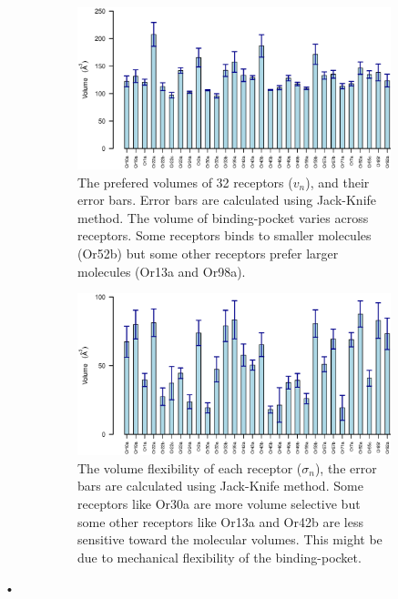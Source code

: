 \documentclass[11pt]{paper} %
\newcommand{\numberofreceptors}{32 }
\begin{document}
\begin{figure}
	\begin{subfigure}[b]{\textwidth}
		\includegraphics[width=\textwidth]{fig/mean-vol}
		\caption{The prefered volumes of \numberofreceptors receptors ($v_n$), and their error bars. Error bars are calculated using Jack-Knife method. 
		The volume of binding-pocket varies across receptors. 
		Some receptors binds to smaller molecules (Or52b) but some other receptors prefer larger molecules (Or13a and Or98a).}
		\label{fig:preferred_volume}
	\end{subfigure}
	\begin{subfigure}[b]{\textwidth}
		\includegraphics[width=\textwidth]{fig/std-vol}
		\caption{The volume flexibility of each receptor ($\sigma_n$), the error bars are calculated using Jack-Knife method.
		Some receptors like Or30a are more volume selective but some other receptors like Or13a and Or42b are less sensitive toward the molecular volumes.
		This might be due to mechanical flexibility of the binding-pocket.}
		\label{fig:volume_flexibility}
	\end{subfigure}
	\caption{}
\end{figure}•
\end{document}
